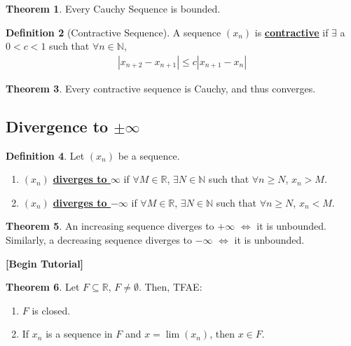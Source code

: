 \documentclass[reqno,11pt]{amsart}
\theoremstyle{definition}
\newtheorem{theorem}{Theorem}
\theoremstyle{definition}
\newtheorem{definition}[theorem]{Definition}
\theoremstyle{remark}
\newcommand{\R}{\mathbb{R}}
\newcommand{\N}{\mathbb{N}}
\newcommand{\dfn}[1]{\underline{\textbf{#1}}}
\begin{document}
\begin{theorem}
	Every Cauchy Sequence is bounded. 
\end{theorem}

\begin{definition}[Contractive Sequence]
	A sequence $(x_n)$ is \dfn{contractive} if $\exists$ a $0 < c < 1$ such that
	$\forall n \in \N$, 
	\begin{align}
		|x_{n+2} - x_{n+1} | \leq  c | x_{n+1} - x_n | 	
	\end{align}
\end{definition}

\begin{theorem}
	Every contractive sequence is Cauchy, and thus converges.
\end{theorem}


\subsection{Divergence to $\pm \infty$}
\begin{definition}
	Let $(x_n)$ be a sequence. 
	\begin{enumerate}[noitemsep]
		\item $(x_n)$ \dfn{diverges to $\infty$} if $\forall M \in \R$, $\exists N \in \N$ such that $\forall n \geq N$, $x_n > M$.
		\item $(x_n)$ \dfn{diverges to $-\infty$} if $\forall M \in \R$, $\exists N \in \N$ such that $\forall n \geq N$, $x_n < M$.
	\end{enumerate}
\end{definition}
\begin{theorem}
	An increasing sequence diverges to $+\infty$ $\iff$ it is unbounded. Similarly, a decreasing sequence diverges to $-\infty$ $\iff$ it is unbounded.
\end{theorem}


\begin{center}
	\textbf{[Begin Tutorial]}
\end{center}

\begin{theorem}
	Let $F \subseteq \R$, $F \neq \emptyset$. Then, TFAE: 
	\begin{enumerate}[noitemsep]
		\item $F$ is closed. 
		\item If $x_n$ is a sequence in $F$ and $x = \lim (x_n)$, then $x \in F$.
	\end{enumerate}
\end{theorem}
\end{document}
